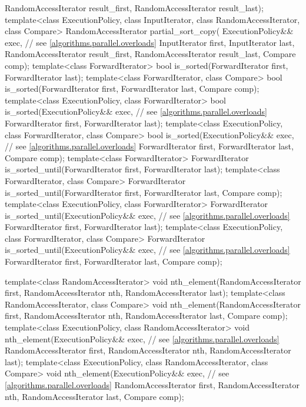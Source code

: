 \begin{codeblock}
{      RandomAccessIterator result_first,
      RandomAccessIterator result_last);
  template<class ExecutionPolicy, class InputIterator, class RandomAccessIterator, class Compare>
    RandomAccessIterator partial_sort_copy(
      ExecutionPolicy&& exec,  // see \ref{algorithms.parallel.overloads}
      InputIterator first, InputIterator last,
      RandomAccessIterator result_first,
      RandomAccessIterator result_last,
      Compare comp);
  template<class ForwardIterator>
    bool is_sorted(ForwardIterator first, ForwardIterator last);
  template<class ForwardIterator, class Compare>
    bool is_sorted(ForwardIterator first, ForwardIterator last,
                   Compare comp);
  template<class ExecutionPolicy, class ForwardIterator>
    bool is_sorted(ExecutionPolicy&& exec, // see \ref{algorithms.parallel.overloads}
                   ForwardIterator first, ForwardIterator last);
  template<class ExecutionPolicy, class ForwardIterator, class Compare>
    bool is_sorted(ExecutionPolicy&& exec, // see \ref{algorithms.parallel.overloads}
                   ForwardIterator first, ForwardIterator last,
                   Compare comp);
  template<class ForwardIterator>
    ForwardIterator is_sorted_until(ForwardIterator first, ForwardIterator last);
  template<class ForwardIterator, class Compare>
    ForwardIterator is_sorted_until(ForwardIterator first, ForwardIterator last,
                                    Compare comp);
  template<class ExecutionPolicy, class ForwardIterator>
    ForwardIterator is_sorted_until(ExecutionPolicy&& exec, // see \ref{algorithms.parallel.overloads}
                                    ForwardIterator first, ForwardIterator last);
  template<class ExecutionPolicy, class ForwardIterator, class Compare>
    ForwardIterator is_sorted_until(ExecutionPolicy&& exec, // see \ref{algorithms.parallel.overloads}
                                    ForwardIterator first, ForwardIterator last,
                                    Compare comp);

  template<class RandomAccessIterator>
    void nth_element(RandomAccessIterator first, RandomAccessIterator nth,
                     RandomAccessIterator last);
  template<class RandomAccessIterator, class Compare>
    void nth_element(RandomAccessIterator first, RandomAccessIterator nth,
                     RandomAccessIterator last, Compare comp);
  template<class ExecutionPolicy, class RandomAccessIterator>
    void nth_element(ExecutionPolicy&& exec, // see \ref{algorithms.parallel.overloads}
                     RandomAccessIterator first, RandomAccessIterator nth,
                     RandomAccessIterator last);
  template<class ExecutionPolicy, class RandomAccessIterator, class Compare>
    void nth_element(ExecutionPolicy&& exec, // see \ref{algorithms.parallel.overloads}
                     RandomAccessIterator first, RandomAccessIterator nth,
                     RandomAccessIterator last, Compare comp);

}
\end{codeblock}
